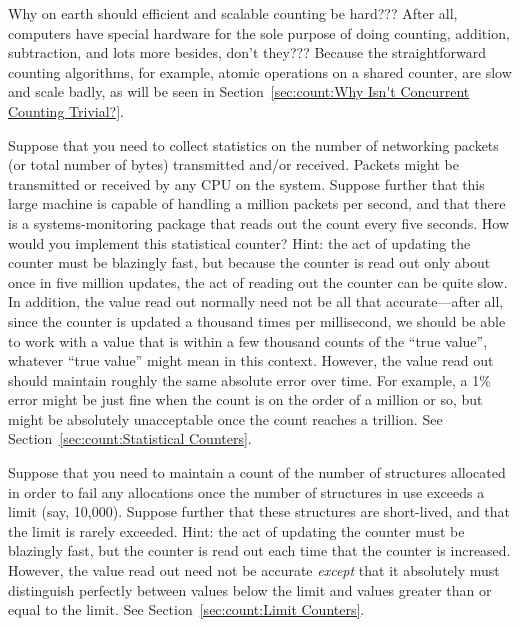 \QuickQ{}
	Why on earth should efficient and scalable counting be hard???
	After all, computers have special hardware for the sole purpose
	of doing counting,
	addition, subtraction, and lots more besides, don't they???
\QuickA{}
	Because the straightforward counting algorithms, for example,
	atomic operations on a shared counter, are slow and scale
	badly, as will be seen in
	Section~\ref{sec:count:Why Isn't Concurrent Counting Trivial?}.

\QuickQ{}
	Suppose that you need to collect statistics on the number
	of networking packets (or total number of bytes) transmitted
	and/or received.
	Packets might be transmitted or received by any CPU on
	the system.
	Suppose further that this large machine is capable of
	handling a million packets per second, and that there
	is a systems-monitoring package that reads out the count
	every five seconds.
	How would you implement this statistical counter?
\QuickA{}
	Hint: the act of updating the counter must be blazingly
	fast, but because the counter is read out only about once
	in five million updates, the act of reading out the counter can be
	quite slow.
	In addition, the value read out normally need not be all that
	accurate---after all, since the counter is updated a thousand
	times per millisecond, we should be able to work with a value
	that is within a few thousand counts of the ``true value'',
	whatever ``true value'' might mean in this context.
	However, the value read out should maintain roughly the same
	absolute error over time.
	For example, a 1\% error might be just fine when the count
	is on the order of a million or so, but might be absolutely
	unacceptable once the count reaches a trillion.
	See Section~\ref{sec:count:Statistical Counters}.

\QuickQ{}
	Suppose that you need to maintain a count of the number of
	structures allocated in order to fail any allocations
	once the number of structures in use exceeds a limit
	(say, 10,000).
	Suppose further that these structures are short-lived,
	and that the limit is rarely exceeded.
\QuickA{}
	Hint: the act of updating the counter must be blazingly
	fast, but the counter is read out each time that the
	counter is increased.
	However, the value read out need not be accurate
	\emph{except} that it absolutely must distinguish perfectly
	between values below the limit and values greater than or
	equal to the limit.
	See Section~\ref{sec:count:Limit Counters}.

